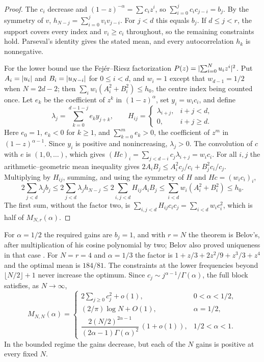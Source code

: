 \begin{proof}
The $c_i$ decrease and $(1-z)^{-\alpha}=\sum c_iz^i$, so $\sum_{i=0}^jc_ic_{j-i}=b_j$. By the symmetry of
$v$, $h_{N-j}=\sum_{i=0}^jv_iv_{j-i}$. For $j<d$ this equals $b_j$. If $d\le j<r$, the support covers every
index and $v_i\ge c_i$ throughout, so the remaining constraints hold. Parseval's identity gives the stated
mean, and every autocorrelation $h_k$ is nonnegative.

For the lower bound use the Fej\'er--Riesz factorization $P(z)=\lvert\sum_{i=0}^Nu_iz^i\rvert^2$. Put
$A_i=\lvert u_i\rvert$ and $B_i=\lvert u_{N-i}\rvert$ for $0\le i<d$, and $w_i=1$ except that $w_{d-1}=1/2$ when
$N=2d-2$; then $\sum_iw_i(A_i^2+B_i^2)\le h_0$, the centre index being counted once. Let $e_k$ be the
coefficient of $z^k$ in $(1-z)^\alpha$, set $y_i=w_ic_i$, and define
\[
 \lambda_j=\sum_{k=0}^{d-1-j}e_ky_{j+k},\qquad
 H_{ij}=\begin{cases}\lambda_{i+j},&i+j<d,\\0,&i+j\ge d.\end{cases}
\]
Here $e_0=1$, $e_k<0$ for $k\ge1$, and $\sum_{k=0}^me_k>0$, the coefficient of $z^m$ in
$(1-z)^{\alpha-1}$. Since $y_i$ is positive and nonincreasing, $\lambda_j>0$. The convolution of $c$ with
$e$ is $(1,0,\dots)$, which gives $(Hc)_i=\sum_{j<d-i}c_j\lambda_{i+j}=w_ic_i$. For all $i,j$ the
arithmetic--geometric mean inequality gives $2A_iB_j\le A_i^2c_j/c_i+B_j^2c_i/c_j$. Multiplying by
$H_{ij}$, summing, and using the symmetry of $H$ and $Hc=(w_ic_i)_i$,
\[
 2\sum_{j<d}\lambda_jb_j\le2\sum_{j<d}\lambda_jh_{N-j}\le2\sum_{i,j<d}H_{ij}A_iB_j
 \le\sum_{i<d}w_i(A_i^2+B_i^2)\le h_0 .
\]
The first sum, without the factor two, is $\sum_{i,j<d}H_{ij}c_ic_j=\sum_{i<d}w_ic_i^2$, which is half of
$M_{N,r}(\alpha)$.
\end{proof}

For $\alpha=1/2$ the required gains are $b_j=1$, and with $r=N$ the theorem is Belov's, after
multiplication of his cosine polynomial by two; Belov also proved uniqueness in that case
\cite{Belov1994Extremal}. For $N=r=4$ and $\alpha=1/3$ the factor is $1+z/3+2z^2/9+z^3/3+z^4$ and the
optimal mean is $184/81$. The constraints at the lower frequencies beyond $\lfloor N/2\rfloor+1$ never
increase the optimum. Since $c_j\sim j^{\alpha-1}/\Gamma(\alpha)$, the full block satisfies, as
$N\to\infty$,
\begin{equation}\label{hec:eq:belovasym}
 M_{N,N}(\alpha)=
 \begin{cases}
 2\sum_{j\ge0}c_j^2+o(1),&0<\alpha<1/2,\\[2pt]
 (2/\pi)\log N+O(1),&\alpha=1/2,\\[2pt]
 \dfrac{2(N/2)^{2\alpha-1}}{(2\alpha-1)\Gamma(\alpha)^2}\,(1+o(1)),&1/2<\alpha<1 .
 \end{cases}
\end{equation}
In the bounded regime the gains decrease, but each of the $N$ gains is positive at every fixed $N$.

